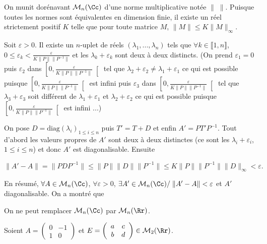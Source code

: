 {\begin{enumerate}
{On munit dorénavant $\mathcal{M}_n(\Cc)$ d'une norme multiplicative notée $\|\;\|$. 
Puisque toutes les normes sont équivalentes en dimension finie, il existe un réel strictement positif $K$ telle que pour toute matrice $M$, $\|M\|\leqslant K\|M\|_\infty$.

Soit $\varepsilon> 0$. Il existe un $n$-uplet de réels $(\lambda_1,...,\lambda_n)$ tels que $\forall k\in\llbracket1,n\rrbracket$, $0\leqslant\varepsilon_k < \frac{\varepsilon}{K\|P\|\|P^{-1}\|}$ et les $\lambda_k+\varepsilon_k$ sont deux à deux distincts. (On prend $\varepsilon_1 = 0$ puis $\varepsilon_2$ dans $\left[0, \frac{\varepsilon}{K\|P\|\|P^{-1}\|}\right[$ tel que $\lambda_2+\varepsilon_2 \neq \lambda_1+\varepsilon_1$ ce qui est possible puisque $\left[0, \frac{\varepsilon}{K\|P\|\|P^{-1}\|}\right[$ est infini puis $\varepsilon_3$ dans $\left[0, \frac{\varepsilon}{K\|P\|\|P^{-1}\|}\right[$ tel que $\lambda_3+\varepsilon_3$ soit différent de $\lambda_1+\varepsilon_1$ et $\lambda_2+\varepsilon_2$ ce qui est possible puisque $\left[0, \frac{\varepsilon}{K\|P\|\|P^{-1}\|}\right[$ est infini ...)

On pose $D=\text{diag}(\lambda_i)_{1\leqslant i\leqslant n}$ puis $T' = T+D$ et enfin $A'=PT'P^{-1}$. Tout d'abord les valeurs propres de $A'$ sont deux à deux distinctes (ce sont les $\lambda_i+\varepsilon_i$, $1\leqslant i\leqslant n$) et donc $A'$ est diagonalisable. Ensuite 

\begin{center}
$\|A'-A\| =\|PDP^{-1}\|\leqslant\|P\|\|D\|\|P^{-1}\|\leqslant K\|P\|\|P^{-1}\|\|D\|_\infty <\varepsilon.$
\end{center}

En résumé, $\forall A\in\mathcal{M}_n(\Cc)$, $\forall\varepsilon>0$, $\exists A'\in\mathcal{M}_n(\Cc)/\;\|A'-A\|<\varepsilon$ et $A'$ diagonalisable. On a montré que

\begin{center}
\end{center}

On ne peut remplacer $\mathcal{M}_n(\Cc)$ par $\mathcal{M}_n(\Rr)$.

Soient $A=\left(
\begin{array}{cc}
0&-1\\
1&0
\end{array}
\right)$ et $E=\left(
\begin{array}{cc}
a&c\\
b&d
\end{array}
\right)\in\mathcal{M}_2(\Rr)$.

}
\end{enumerate}}
